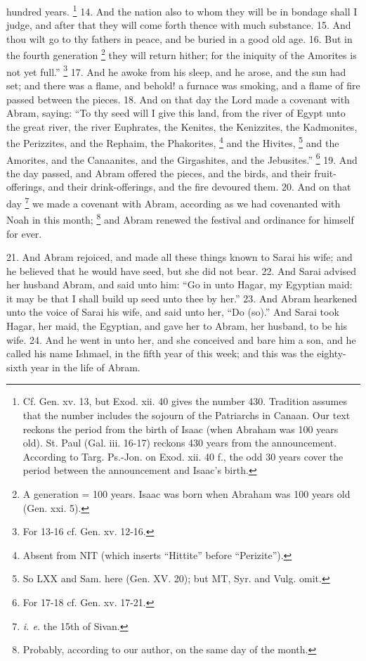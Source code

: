 hundred years. \footnote{Cf. Gen. xv. 13, but Exod. xii. 40 gives the number 430. Tradition assumes that the number includes the sojourn of the Patriarchs in Canaan. Our text reckons the period from the birth of Isaac (when Abraham was 100 years old). St. Paul (Gal. iii. 16-17) reckons 430 years from the announcement. According to Targ. Ps.-Jon. on Exod. xii. 40 f., the odd 30 years cover the period between the announcement and Isaac's birth.} 14. And the nation also to whom they will be in bondage shall I judge, and after that they will come forth thence with much substance. 15. And thou wilt go to thy fathers in peace, and be buried in a good old age. 16. But in the fourth generation \footnote{A generation = 100 years. Isaac was born when Abraham was 100 years old (Gen. xxi. 5).} they will return hither; for the iniquity of the Amorites is not yet full.'' \footnote{For 13-16 cf. Gen. xv. 12-16.} 17. And he awoke from his sleep, and he arose, and the sun had set; and there was a flame, and behold! a furnace was smoking, and a flame of fire passed between the pieces. 18. And on that day the Lord made a covenant with Abram, saying: ``To thy seed will I give this land, from the river of Egypt unto the great river, the river Euphrates, the Kenites, the Kenizzites, the Kadmonites, the Perizzites, and the Rephaim, the Phakorites, \footnote{Absent from NIT (which inserts ``Hittite'' before ``Perizite'').} and the Hivites, \footnote{So LXX and Sam. here (Gen. XV. 20); but MT, Syr. and Vulg. omit.} and the Amorites, and the Canaanites, and the Girgashites, and the Jebusites.'' \footnote{For 17-18 cf. Gen. xv. 17-21.} 19. And the day passed, and Abram offered the pieces, and the birds, and their fruit-offerings, and their drink-offerings, and the fire devoured them. 20. And on that day \footnote{\emph{i. e.} the 15th of Sivan.} we made a covenant with Abram, according as we had covenanted with Noah in this month; \footnote{Probably, according to our author, on the same day of the month.} and Abram renewed the festival and ordinance for himself for ever.


21. And Abram rejoiced, and made all these things known to Sarai his wife; and he believed that he would have seed, but she did not bear. 22. And Sarai advised her husband Abram, and said unto him: ``Go in unto Hagar, my Egyptian maid: it may be that I shall build up seed unto thee by her.'' 23. And Abram hearkened unto the voice of Sarai his wife, and said unto her, ``Do (so).'' And Sarai took Hagar, her maid, the Egyptian, and gave her to Abram, her husband, to be his wife. 24. And he went in unto her, and she conceived and bare him a son, and he called his name Ishmael, in the fifth year of this week; and this was the eighty-sixth year in the life of Abram.

